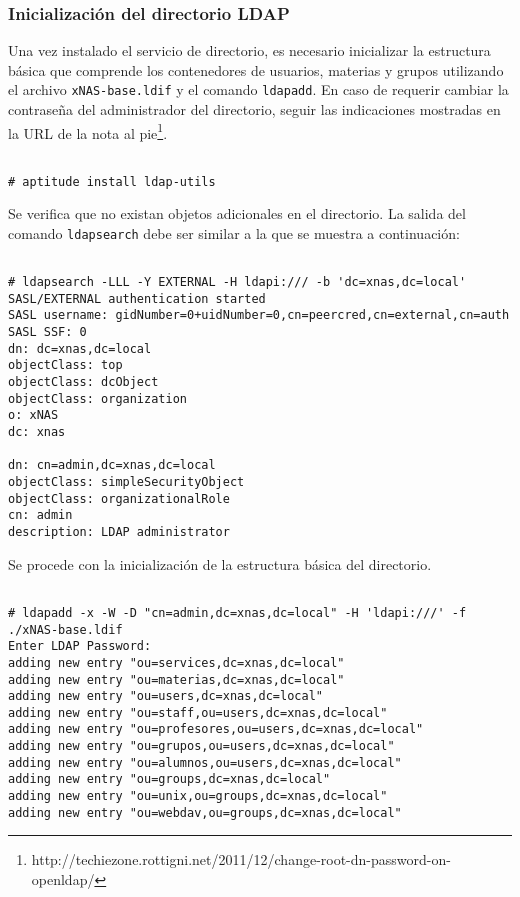           \subsubsection {Inicializaci\'{o}n del directorio \textsc{LDAP}}

Una vez instalado el servicio de directorio, es necesario inicializar la estructura b\'{a}sica que comprende los contenedores de usuarios, materias y grupos utilizando el archivo \texttt{xNAS-base.ldif} y el comando \texttt{ldapadd}. En caso de requerir cambiar la contrase\~{n}a del administrador del directorio, seguir las indicaciones mostradas en la URL de la nota al pie\footnote{http://techiezone.rottigni.net/2011/12/change-root-dn-password-on-openldap/}.


{
\scriptsize
\linespread{1}
\begin{verbatim}

# aptitude install ldap-utils
 \end{verbatim}
}

Se verifica que no existan objetos adicionales en el directorio. La salida del comando \texttt{ldapsearch} debe ser similar a la que se muestra a continuaci\'{o}n:

{
\scriptsize
\linespread{1}
\begin{verbatim}

# ldapsearch -LLL -Y EXTERNAL -H ldapi:/// -b 'dc=xnas,dc=local'
SASL/EXTERNAL authentication started
SASL username: gidNumber=0+uidNumber=0,cn=peercred,cn=external,cn=auth
SASL SSF: 0
dn: dc=xnas,dc=local
objectClass: top
objectClass: dcObject
objectClass: organization
o: xNAS
dc: xnas

dn: cn=admin,dc=xnas,dc=local
objectClass: simpleSecurityObject
objectClass: organizationalRole
cn: admin
description: LDAP administrator
 \end{verbatim}
}

Se procede con la inicializaci\'{o}n de la estructura b\'{a}sica del directorio.

{
\scriptsize
\linespread{1}
\begin{verbatim}

# ldapadd -x -W -D "cn=admin,dc=xnas,dc=local" -H 'ldapi:///' -f ./xNAS-base.ldif
Enter LDAP Password: 
adding new entry "ou=services,dc=xnas,dc=local"
adding new entry "ou=materias,dc=xnas,dc=local"
adding new entry "ou=users,dc=xnas,dc=local"
adding new entry "ou=staff,ou=users,dc=xnas,dc=local"
adding new entry "ou=profesores,ou=users,dc=xnas,dc=local"
adding new entry "ou=grupos,ou=users,dc=xnas,dc=local"
adding new entry "ou=alumnos,ou=users,dc=xnas,dc=local"
adding new entry "ou=groups,dc=xnas,dc=local"
adding new entry "ou=unix,ou=groups,dc=xnas,dc=local"
adding new entry "ou=webdav,ou=groups,dc=xnas,dc=local"
\end{verbatim}
}

